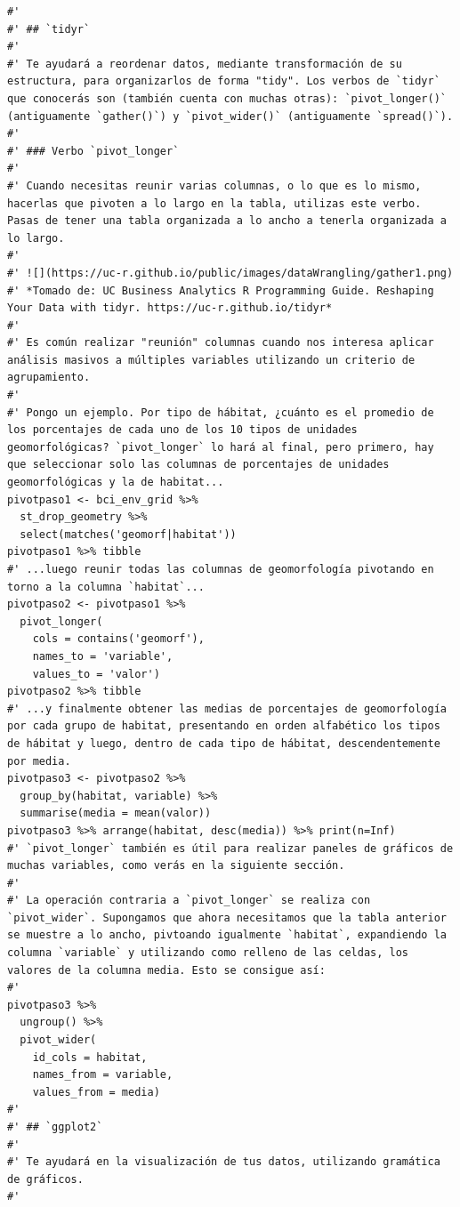 \documentclass[11pt,]{article}
\begin{document}
\begin{verbatim}
#' 
#' ## `tidyr`
#' 
#' Te ayudará a reordenar datos, mediante transformación de su estructura, para organizarlos de forma "tidy". Los verbos de `tidyr` que conocerás son (también cuenta con muchas otras): `pivot_longer()` (antiguamente `gather()`) y `pivot_wider()` (antiguamente `spread()`).
#' 
#' ### Verbo `pivot_longer`
#' 
#' Cuando necesitas reunir varias columnas, o lo que es lo mismo, hacerlas que pivoten a lo largo en la tabla, utilizas este verbo. Pasas de tener una tabla organizada a lo ancho a tenerla organizada a lo largo.
#' 
#' ![](https://uc-r.github.io/public/images/dataWrangling/gather1.png)
#' *Tomado de: UC Business Analytics R Programming Guide. Reshaping Your Data with tidyr. https://uc-r.github.io/tidyr*
#' 
#' Es común realizar "reunión" columnas cuando nos interesa aplicar análisis masivos a múltiples variables utilizando un criterio de agrupamiento. 
#' 
#' Pongo un ejemplo. Por tipo de hábitat, ¿cuánto es el promedio de los porcentajes de cada uno de los 10 tipos de unidades geomorfológicas? `pivot_longer` lo hará al final, pero primero, hay que seleccionar solo las columnas de porcentajes de unidades geomorfológicas y la de habitat...
pivotpaso1 <- bci_env_grid %>%
  st_drop_geometry %>% 
  select(matches('geomorf|habitat'))
pivotpaso1 %>% tibble
#' ...luego reunir todas las columnas de geomorfología pivotando en torno a la columna `habitat`...
pivotpaso2 <- pivotpaso1 %>%
  pivot_longer(
    cols = contains('geomorf'),
    names_to = 'variable',
    values_to = 'valor')
pivotpaso2 %>% tibble
#' ...y finalmente obtener las medias de porcentajes de geomorfología por cada grupo de habitat, presentando en orden alfabético los tipos de hábitat y luego, dentro de cada tipo de hábitat, descendentemente por media.
pivotpaso3 <- pivotpaso2 %>%
  group_by(habitat, variable) %>% 
  summarise(media = mean(valor))
pivotpaso3 %>% arrange(habitat, desc(media)) %>% print(n=Inf)
#' `pivot_longer` también es útil para realizar paneles de gráficos de muchas variables, como verás en la siguiente sección.
#' 
#' La operación contraria a `pivot_longer` se realiza con `pivot_wider`. Supongamos que ahora necesitamos que la tabla anterior se muestre a lo ancho, pivtoando igualmente `habitat`, expandiendo la columna `variable` y utilizando como relleno de las celdas, los valores de la columna media. Esto se consigue así:
#' 
pivotpaso3 %>%
  ungroup() %>%
  pivot_wider(
    id_cols = habitat,
    names_from = variable,
    values_from = media)
#' 
#' ## `ggplot2`
#' 
#' Te ayudará en la visualización de tus datos, utilizando gramática de gráficos.
#'

\end{verbatim}
\end{document}
